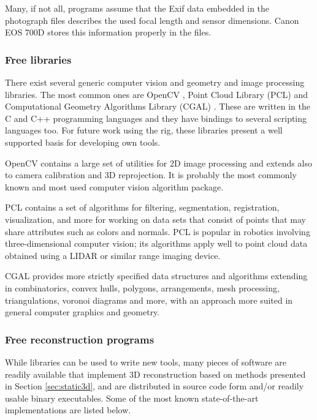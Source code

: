 Many, if not all, programs assume that the Exif data embedded in the photograph files describes the used focal length and sensor dimensions.
Canon EOS 700D stores this information properly in the files.


\subsubsection{Free libraries} %

There exist several generic computer vision and geometry and image processing libraries.
The most common ones are OpenCV \cite{opencv}, Point Cloud Library (PCL) \cite{pcl} and Computational Geometry Algorithms Library (CGAL) \cite{cgal}.
These are written in the C and C++ programming languages and they have bindings to several scripting languages too.
For future work using the rig, these libraries present a well supported basis for developing own tools.

OpenCV contains a large set of utilities for 2D image processing and extends also to camera calibration and 3D reprojection.
It is probably the most commonly known and most used computer vision algorithm package.

PCL contains a set of algorithms for filtering, segmentation, registration, visualization, and more for working on data sets that consist of points that may share attributes such as colors and normals.
PCL is popular in robotics involving three-dimensional computer vision; its algorithms apply well to point cloud data obtained using a LIDAR or similar range imaging device.

CGAL provides more strictly specified data structures and algorithms extending in combinatorics, convex hulls, polygons, arrangements, mesh processing, triangulations, voronoi diagrams and more, with an approach more suited in general computer graphics and geometry.


\subsubsection{Free reconstruction programs} %

While libraries can be used to write new tools, many pieces of software are readily available that implement 3D reconstruction based on methods presented in Section \ref{sec:static3d}, and are distributed in source code form and/or readily usable binary executables.
Some of the most known state-of-the-art implementations are listed below.


